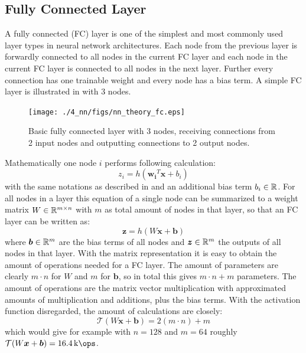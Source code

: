 
\subsection{Fully Connected Layer}
A fully connected (FC) layer is one of the simplest and most commonly used layer types in neural network architectures.
Each node from the previous layer is forwardly connected to all nodes in the current FC layer and each node in the current FC layer is connected to all nodes in the next layer.
Further every connection has one trainable weight and every node has a bias term.
A simple FC layer is illustrated in  with 3 nodes.
\begin{figure}[!ht]
  \centering
    \texttt{[image: ./4\_nn/figs/nn\_theory\_fc.eps]}
  \caption{Basic fully connected layer with 3 nodes, receiving connections from 2 input nodes and outputting connections to 2 output nodes.}
  \label{fig:nn_theory_fc}
\end{figure}
\FloatBarrier
\noindent
Mathematically one node $i$ performs following calculation:
\begin{equation}
  z_i = h(\bm{w_i}^T \bm{x} + b_i)
\end{equation}
with the same notations as described in  and an additional bias term $b_i \in \mathbb{R}$.
For all nodes in a layer this equation of a single node can be summarized to a weight matrix $W \in \mathbb{R}^{m \times n}$ with $m$ as total amount of nodes in that layer, so that an FC layer can be written as:
\begin{equation}
  \bm{z} = h(W \bm{x} + \bm{b})
\end{equation}
where $\bm{b} \in \mathbb{R}^m$ are the bias terms of all nodes and $\bm{z} \in \mathbb{R}^m$ the outputs of all nodes in that layer.
With the matrix representation it is easy to obtain the amount of operations needed for a FC layer.
The amount of parameters are clearly $m \cdot n$ for $W$ and $m$ for $\bm{b}$, so in total this gives $m \cdot n + m$ parameters.
The amount of operations are the matrix vector multiplication with approximated amounts of multiplication and additions, plus the bias terms.
With the activation function disregarded, the amount of calculations are closely:
\begin{equation} 
  \mathcal{T}(W \bm{x} + \bm{b}) = 2 (m \cdot n) + m
\end{equation}
which would give for example with $n = 128$ and $m = 64$ roughly $\mathcal{T}(W \bm{x} + \bm{b}) = \SI{16.4}{\kilo\ops}$.



